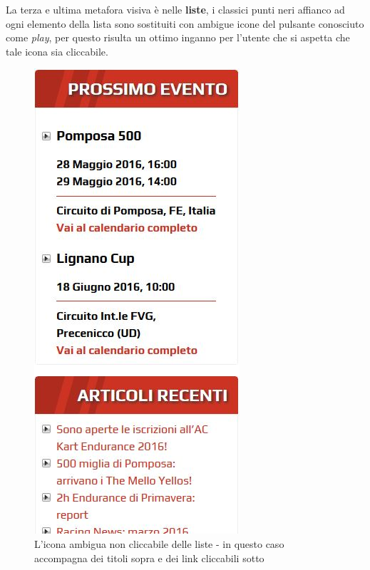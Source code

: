 			La terza e ultima metafora visiva è nelle \textbf{liste}, i classici punti neri affianco ad ogni elemento della lista sono sostituiti con ambigue icone del pulsante conosciuto come \textit{play}, per questo risulta un ottimo inganno per l'utente che si aspetta che tale icona sia cliccabile.
			
		\begin{figure} [h]
			\centering
			\includegraphics[scale=0.44]{images/MaybeImALink}
			\caption{L'icona ambigua non cliccabile delle liste - in questo caso accompagna dei titoli sopra e dei link cliccabili sotto}
			\label{fig:Footer2}
		\end{figure}
				